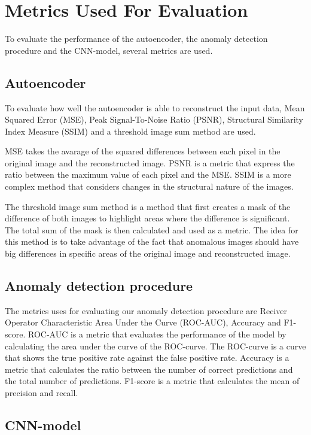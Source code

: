 \section{Metrics Used For Evaluation}

To evaluate the performance of the autoencoder, the anomaly detection procedure and the CNN-model, several metrics are used. 

\subsection{Autoencoder}

To evaluate how well the autoencoder is able to reconstruct the input data,  Mean Squared Error (MSE), Peak Signal-To-Noise Ratio (PSNR), Structural Similarity Index Measure (SSIM) and a threshold image sum method are used. 
\par
MSE takes the avarage of the squared differences between each pixel in the original image and the reconstructed image. PSNR is a metric that express the ratio between the maximum value of each pixel and the MSE. SSIM is a more complex method that considers changes in the structural nature of the images. 
\par
The threshold image sum method is a method that first creates a mask of the difference of both images to highlight areas where the difference is significant. The total sum of the mask is then calculated and used as a metric. The idea for this method is to take advantage of the fact that anomalous images should have big differences in specific areas of the original image and reconstructed image.

\subsection{Anomaly detection procedure}

The metrics uses for evaluating our anomaly detection procedure are Reciver Operator Characteristic Area Under the Curve (ROC-AUC), Accuracy and F1-score. ROC-AUC is a metric that evaluates the performance of the model by calculating the area under the curve of the ROC-curve. The ROC-curve is a curve that shows the true positive rate against the false positive rate. Accuracy is a metric that calculates the ratio between the number of correct predictions and the total number of predictions. F1-score is a metric that calculates the mean of precision and recall.

\subsection{CNN-model}

